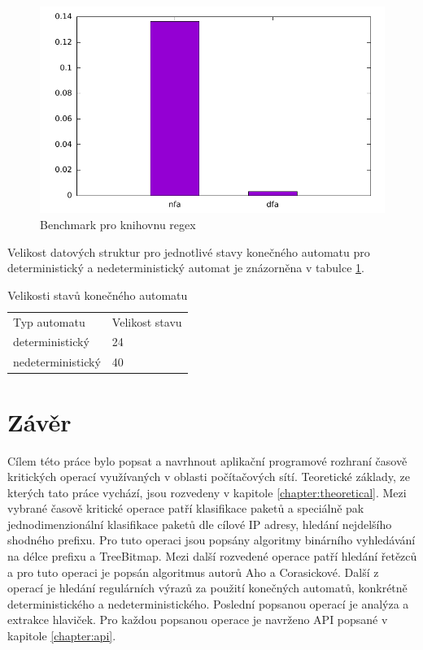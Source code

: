 \begin{figure}[!htbp]
	\centering
	\includegraphics[scale=0.7]{fig/regex.pdf}
	\caption{Benchmark pro knihovnu regex}
    \label{fig:regex}
\end{figure}

Velikost datových struktur pro jednotlivé stavy konečného automatu pro deterministický a nedeterministický
automat je znázorněna v tabulce \ref{tab:regex-size}.

\begin{table}[!htbp]
    \center
    \begin{tabular}{|l|l|}
    \hline
    Typ automatu & Velikost stavu\\ \hhline{|=|=|}
    deterministický  & 24\\ \hline
    nedeterministický & 40\\ \hline
    \end{tabular}
    \caption{Velikosti stavů konečného automatu}
    \label{tab:regex-size}
\end{table}

\chapter{Závěr}\label{chapter:conclusion} %
Cílem této práce bylo popsat a navrhnout aplikační programové rozhraní časově kritických operací využívaných v oblasti
počítačových sítí.
Teoretické základy, ze kterých tato práce vychází, jsou rozvedeny v kapitole \ref{chapter:theoretical}.
Mezi vybrané časově kritické operace patří klasifikace paketů a speciálně pak jednodimenzionální klasifikace paketů
dle cílové IP adresy, hledání nejdelšího shodného prefixu. Pro tuto operaci jsou popsány
algoritmy binárního vyhledávání na délce prefixu a TreeBitmap.
Mezi další rozvedené operace patří hledání řetězců a pro tuto operaci je popsán
algoritmus autorů Aho a Corasickové. Další z operací je hledání regulárních výrazů
za použití konečných automatů, konkrétně deterministického a nedeterministického.
Poslední popsanou operací je analýza a extrakce hlaviček.
Pro každou popsanou operace je navrženo API popsané v kapitole \ref{chapter:api}.

